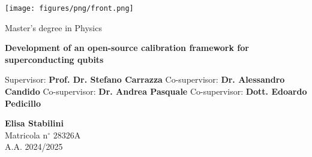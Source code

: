 \frontmatter
{
\thispagestyle{empty}

\centerline{
\texttt{[image: figures/png/front.png]}
}

\begin{center}
{\Large  Master's degree in Physics }
\end{center}


\vskip1.5cm
\begin{center}
{\fontsize{15}{20}\selectfont \textbf{Development of an open-source calibration framework for superconducting qubits\\}}
\end{center}


{\large
\vskip 20mm Supervisor:
\vskip 0.2mm \large  \textbf{Prof. Dr. Stefano Carrazza}
\vskip 5mm
\large Co-supervisor:
\vskip 0.2mm
\large \textbf{Dr. Alessandro Candido}
\vskip 5mm
\large Co-supervisor:
\vskip 0.2mm
\large \textbf{Dr. Andrea Pasquale}
\vskip 5mm
\large Co-supervisor:
\vskip 0.2mm
\large \textbf{Dott. Edoardo Pedicillo}
}
}

\vskip 2cm
\noindent
\hfill
\parbox[t]{7cm}{
    \large
    \raggedright
    \textbf{Elisa Stabilini} \\
    Matricola n$^\circ$ $28326\mathrm{A}$ \\
    A.A. 2024/2025
}  